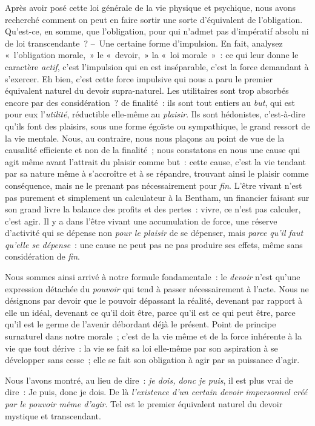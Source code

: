 \documentclass[french,twoside]{book} %
\begin{document}
Après avoir posé cette loi générale de la vie physique et psychique, nous avons recherché comment on peut en faire sortir une sorte d’équivalent de l’obligation. Qu’est-ce, en somme, que l’obligation, pour qui n’admet pas d’impératif absolu ni de loi transcendante ? – Une certaine forme d’impulsion. En fait, analysez « l’obligation morale, » le « devoir, » la « loi morale » : ce qui leur donne le caractère \emph{actif}, c’est l’impulsion qui en est inséparable, c’est la force demandant à s’exercer. Eh bien, c’est cette force impulsive qui nous a paru le premier équivalent naturel du devoir supra-naturel. Les utilitaires sont trop absorbés encore par des considération ? de finalité : ils sont tout entiers au \emph{but}, qui est pour eux l’\emph{utilité}, réductible elle-même au \emph{plaisir}. Ils sont hédonistes, c’est-à-dire qu’ils font des plaisirs, sous une forme égoïste ou sympathique, le grand ressort de la vie mentale. Nous, au contraire, nous nous plaçons au point de vue de la causalité efficiente et non de la finalité ; nous constatons en nous une cause qui agit même avant l’attrait du plaisir comme but : cette cause, c’est la vie tendant par sa nature même à s’accroître et à se répandre, trouvant ainsi le plaisir comme conséquence, mais ne le prenant pas nécessairement pour \emph{fin}. L’être vivant n’est pas purement et simplement un calculateur à la Bentham, un financier faisant sur son grand livre la balance des profits et des pertes : vivre, ce n’est pas calculer, c’est agir. Il y a dans l’être vivant une accumulation de force, une réserve d’activité qui se dépense non \emph{pour le plaisir} de se dépenser, mais \emph{parce qu’il faut qu’elle se dépense} : une cause ne peut pas ne pas produire ses effets, même sans considération de \emph{fin}.\par
Nous sommes ainsi arrivé à notre formule fondamentale : le \emph{devoir} n’est qu’une expression détachée du \emph{pouvoir} qui tend à passer nécessairement à l’acte. Nous ne désignons par devoir que le pouvoir dépassant la réalité, devenant par rapport à elle un idéal, devenant ce qu’il doit être, parce qu’il est ce qui peut être, parce qu’il est le germe de l’avenir débordant déjà le présent. Point de principe surnaturel dans notre morale ; c’est de la vie même et de la force inhérente à la vie que tout dérive : la vie se fait sa loi elle-même par son aspiration à se développer sans cesse ; elle se fait son obligation à agir par sa puissance d’agir.\par
Nous l’avons montré, au lieu de dire : \emph{je dois, donc je puis}, il est plus vrai de dire : Je puis, donc je dois. De là \emph{l’existence d’un certain devoir impersonnel créé par le pouvoir même d’agir}. Tel est le premier équivalent naturel du devoir mystique et transcendant.\par
\end{document}
